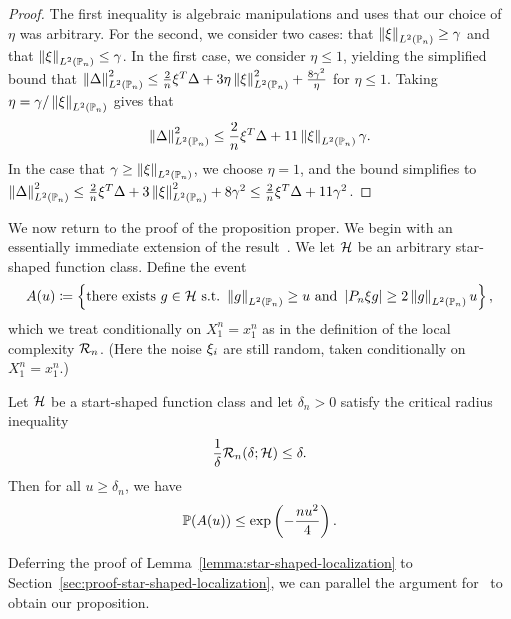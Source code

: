 \begin{proof}
  The first inequality is algebraic manipulations and
  uses that our choice of $\eta$ was arbitrary.
  For the second, we consider two cases:
  that $\LtwoPn{\noise} \ge \gamma$ and that $\LtwoPn{\noise} \le \gamma$.
  In the first case, we consider $\eta \le 1$,
  yielding the simplified bound
  that
  $\LtwoPn{\Delta}^2 \le \frac{2}{n} \noise^T \Delta
  + 3 \eta \LtwoPn{\noise}^2 + \frac{8 \gamma^2}{\eta}$ for
  $\eta \le 1$. Taking $\eta = \gamma / \LtwoPn{\noise}$ gives
  that
  \begin{equation*}
    \LtwoPn{\Delta}^2
    \le \frac{2}{n} \noise^T \Delta
    + 11 \LtwoPn{\noise} \gamma.
  \end{equation*}
  In the case that $\gamma \ge \LtwoPn{\noise}$, we choose $\eta = 1$,
  and the bound simplifies to
  $\LtwoPn{\Delta}^2 \le \frac{2}{n} \noise^T \Delta
  + 3 \LtwoPn{\noise}^2 + 8 \gamma^2
  \le \frac{2}{n} \noise^T \Delta + 11 \gamma^2$.
\end{proof}

We now return to the proof of the proposition proper.
We begin with an essentially immediate extension of the result~\cite[Lemma
  13.12]{Wainwright19}.  We let $\mc{H}$ be an arbitrary star-shaped
function class.
Define the event
\begin{equation}
  \label{eqn:A-wainwright-event}
  A(u) \defeq \left\{
  \mbox{there~exists~} g \in \mc{H} ~ \mbox{s.t.}~
  \LtwoPn{g} \ge u ~ \mbox{and} ~
  \left|P_n \noise g\right| \ge 2 \LtwoPn{g} u
  \right\},
\end{equation}
which we treat conditionally on $X_1^n = x_1^n$ as in the definition
of the local complexity $\localcomplexity_n$.
(Here the noise $\noise_i$ are still random, taken conditionally
on $X_1^n = x_1^n$.)

\begin{lemma}
  \label{lemma:star-shaped-localization}
  Let $\mc{H}$ be a start-shaped function class
  and let $\delta_n > 0$ satisfy the critical radius inequality
  \begin{equation*}
    \frac{1}{\delta} \localcomplexity_n(\delta; \mc{H}) \le
    \delta.
  \end{equation*}
  Then for all $u \ge \delta_n$, we have
  \begin{equation*}
    \P(A(u)) \le \exp\left(-\frac{n u^2}{4} \right).
  \end{equation*}
\end{lemma}
\noindent
Deferring the proof of Lemma~\ref{lemma:star-shaped-localization}
to Section~\ref{sec:proof-star-shaped-localization},
we can parallel the argument for~\cite[Thm.~13.5]{Wainwright19}
to obtain our proposition.

